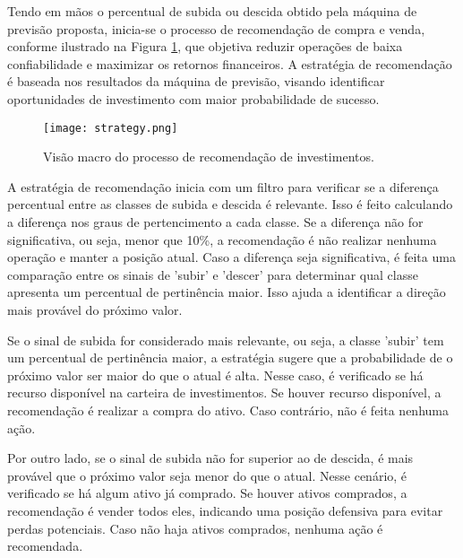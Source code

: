 Tendo em mãos o percentual de subida ou descida obtido pela máquina de previsão proposta, inicia-se o processo de recomendação de compra e venda, conforme ilustrado na Figura \ref{fig:strategy}, que objetiva reduzir operações de baixa confiabilidade e maximizar os retornos financeiros. A estratégia de recomendação é baseada nos resultados da máquina de previsão, visando identificar oportunidades de investimento com maior probabilidade de sucesso.

\begin{figure}[htbp]
    \caption{Visão macro do processo de recomendação de investimentos.}
      \centering
    \texttt{[image: strategy.png]} 
    \label{fig:strategy}
\end{figure}


A estratégia de recomendação inicia com um filtro para verificar se a diferença percentual entre as classes de subida e descida é relevante. Isso é feito calculando a diferença nos graus de pertencimento a cada classe. Se a diferença não for significativa, ou seja, menor que 10\%, a recomendação é não realizar nenhuma operação e manter a posição atual.
Caso a diferença seja significativa, é feita uma comparação entre os sinais de 'subir' e 'descer' para determinar qual classe apresenta um percentual de pertinência maior. Isso ajuda a identificar a direção mais provável do próximo valor.

Se o sinal de subida for considerado mais relevante, ou seja, a classe 'subir' tem um percentual de pertinência maior, a estratégia sugere que a probabilidade de o próximo valor ser maior do que o atual é alta. Nesse caso, é verificado se há recurso disponível na carteira de investimentos. Se houver recurso disponível, a recomendação é realizar a compra do ativo. Caso contrário, não é feita nenhuma ação.

Por outro lado, se o sinal de subida não for superior ao de descida, é mais provável que o próximo valor seja menor do que o atual. Nesse cenário, é verificado se há algum ativo já comprado. Se houver ativos comprados, a recomendação é vender todos eles, indicando uma posição defensiva para evitar perdas potenciais. Caso não haja ativos comprados, nenhuma ação é recomendada.